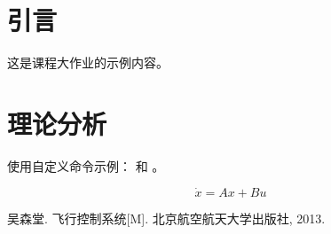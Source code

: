 \documentclass{sysureport}
\author{硕士}
\begin{document}
\maketitlepage

\section{引言}
这是课程大作业的示例内容。

\section{理论分析}
使用自定义命令示例： 和 。

\begin{equation}
\dot{x} = Ax + Bu
\end{equation}

\begin{thebibliography}{99}
 吴森堂. 飞行控制系统[M]. 北京航空航天大学出版社, 2013.
\end{thebibliography}
\end{document}
